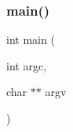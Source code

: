 \subsubsection{\texorpdfstring{main()}{main()}}
{\footnotesize\ttfamily int main (\begin{DoxyParamCaption}\item[{int}]{argc,  }\item[{char $\ast$$\ast$}]{argv }\end{DoxyParamCaption})}

